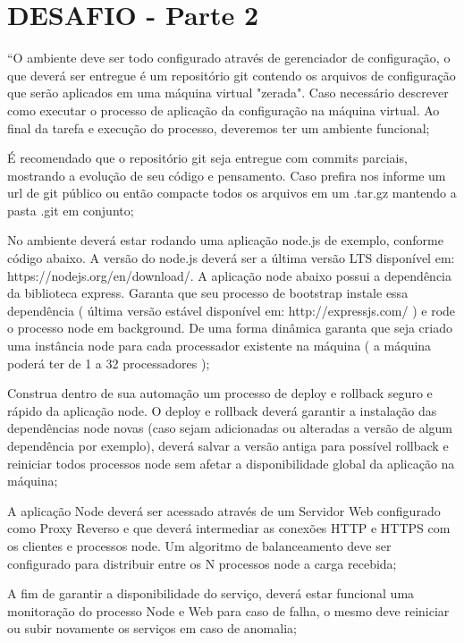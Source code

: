 \section{DESAFIO - Parte 2}

``O ambiente deve ser todo configurado através de gerenciador de
configuração, o que deverá ser entregue é um repositório git contendo
os arquivos de configuração que serão aplicados em uma máquina virtual
"zerada". Caso necessário descrever como executar o processo de
aplicação da configuração na máquina virtual. Ao final da tarefa e
execução do processo, deveremos ter um ambiente funcional; 

É recomendado que o repositório git seja entregue com commits
parciais, mostrando a evolução de seu código e pensamento. Caso
prefira nos informe um url de git público ou então compacte todos os
arquivos em um .tar.gz mantendo a pasta .git em conjunto; 

No ambiente deverá estar rodando uma aplicação node.js de exemplo,
conforme código abaixo. A versão do node.js deverá ser a última versão
LTS disponível em: https://nodejs.org/en/download/. A aplicação node
abaixo possui a dependência da biblioteca express. Garanta que seu
processo de bootstrap instale essa dependência ( última versão estável
disponível em: http://expressjs.com/ ) e rode o processo node em
background. De uma forma dinâmica garanta que seja criado uma
instância node para cada processador existente na máquina ( a máquina
poderá ter de 1 a 32 processadores );

Construa dentro de sua automação um processo de deploy e rollback
seguro e rápido da aplicação node. O deploy e rollback deverá garantir
a instalação das dependências node novas (caso sejam adicionadas ou
alteradas a versão de algum dependência por exemplo), deverá salvar a
versão antiga para possível rollback e reiniciar todos processos node
sem afetar a disponibilidade global da aplicação na máquina; 

A aplicação Node deverá ser acessado através de um Servidor Web
configurado como Proxy Reverso e que deverá intermediar as conexões
HTTP e HTTPS com os clientes e processos node. Um algoritmo de
balanceamento deve ser configurado para distribuir entre os N
processos node a carga recebida; 

A fim de garantir a disponibilidade do serviço, deverá estar funcional
uma monitoração do processo Node e Web para caso de falha, o mesmo
deve reiniciar ou subir novamente os serviços em caso de anomalia; 

